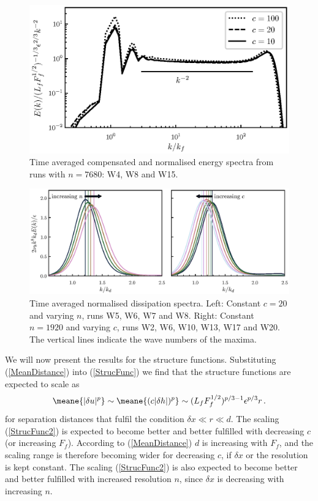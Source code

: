\begin{figure}
\centerline{\includegraphics[]{paper_04_shallow_water/Pyfig/fig10}}
\caption{Time averaged compensated and normalised energy spectra
from runs with $ n = 7680 $: W4, W8 and W15.}
\label{fig_spectra_c40}
\end{figure}

\begin{figure}
\centerline{\includegraphics[]{paper_04_shallow_water/Pyfig/fig11}}
\caption{Time averaged normalised dissipation spectra. Left: Constant $ c = 20 $ and varying $ n $, runs  W5, W6, W7 and W8. Right: Constant $ n= 1920 $ and varying $ c $, runs W2, W6, W10, W13, W17 and W20. The vertical lines indicate the wave numbers of the maxima.}
\label{fig_disspectra}
\end{figure}



We will now present the results for the structure functions. Substituting
(\ref{MeanDistance}) into (\ref{StrucFunc}) we find that the structure
functions are expected to scale as
\begin{equation} \label{StrucFunc2}
\meane{|\delta u |^p}  \sim \meane{(c|\delta h |)^p} \sim  (L_f F_f^{1/2})^{p/3-1}  \epsilon^{p/3}  r  \, .
\end{equation}
for separation distances that fulfil the condition $ \delta x \ll r \ll d $.
The scaling (\ref{StrucFunc2}) is
expected to become better and better fulfilled with decreasing $ c $ (or
increasing $ F_f $). According to (\ref{MeanDistance})
$ d $ is increasing with $ F_f $, and the scaling range is therefore becoming
wider for decreasing $ c $, if $ \delta x $ or the resolution  is kept
constant. The scaling
(\ref{StrucFunc2}) is also expected to become better and better fulfilled with
increased resolution $ n $, since $ \delta x $ is decreasing with increasing $
n $.

